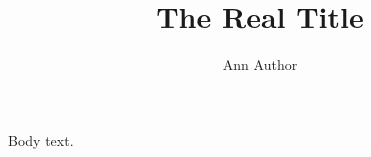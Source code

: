 \documentclass{article}
\title{The Real Title}
\author{Ann Author}
\begin{document}
\begin{titlepage}
\thispagestyle{empty}
\vspace*{2cm}
\end{titlepage}
\maketitle
Body text.
\end{document}
